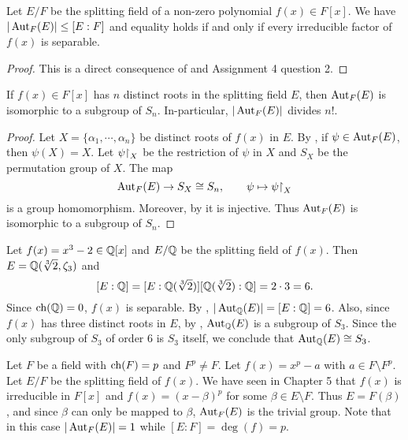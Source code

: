 \documentclass[11pt]{article}
\begin{document}
\begin{theorem}
    Let $E/F$ be the splitting field of a non-zero polynomial $f(x)\in F[x]$. We have $|\operatorname{Aut}_F(E)|\leq[E:F]$ and equality holds if and only if every irreducible factor of $f(x)$ is separable.
\end{theorem}

\begin{proof}
    This is a direct consequence of  and Assignment 4 question 2.
    
\end{proof}

\begin{theorem}
    If $f(x)\in F[x]$ has $n$ distinct roots in the splitting field $E$, then $\operatorname{Aut}_F(E)$ is isomorphic to a subgroup of $S_n$. In-particular, $|\operatorname{Aut}_F(E)|$ divides $n!$.
\end{theorem}

\begin{proof}
    Let $X=\{\alpha_1,\cdots,\alpha_n\}$ be distinct roots of $f(x)$ in $E$. By , if $\psi\in\operatorname{Aut}_F(E)$, then $\psi(X)=X$. Let $\psi{\upharpoonright}_X$ be the restriction of $\psi$ in $X$ and $S_X$ be the permutation group of $X$. The map
    \[\operatorname{Aut}_F(E)\to S_X\cong S_n,\qquad\psi\mapsto\psi{\upharpoonright}_X\]
    is a group homomorphism. Moreover, by  it is injective. Thus $\operatorname{Aut}_F(E)$ is isomorphic to a subgroup of $S_n$.
    
\end{proof}

\begin{example}
    Let $f(x)=x^3-2\in\mathbb{Q}[x]$ and $E/\mathbb{Q}$ be the splitting field of $f(x)$. Then $E=\mathbb{Q}(\sqrt[3]{2},\zeta_3)$ and
    \[[E:\mathbb{Q}]=[E:\mathbb{Q}(\sqrt[3]{2})][\mathbb{Q}(\sqrt[3]{2}):\mathbb{Q}]=2\cdot3=6.\]
    Since $\operatorname{ch}(\mathbb{Q})=0$, $f(x)$ is separable. By , $|\operatorname{Aut}_{\mathbb{Q}}(E)|=[E:\mathbb{Q}]=6$. Also, since $f(x)$ has three distinct roots in $E$, by , $\operatorname{Aut}_{\mathbb{Q}}(E)$ is a subgroup of $S_3$. Since the only subgroup of $S_3$ of order 6 is $S_3$ itself, we conclude that $\operatorname{Aut}_{\mathbb{Q}}(E)\cong S_3$.
\end{example}

\begin{example}
    Let $F$ be a field with $\operatorname{ch}(F)=p$ and $F^p\neq F$. Let $f(x)=x^p-a$ with $a\in F\setminus F^p$. Let $E/F$ be the splitting field of $f(x)$. We have seen in Chapter 5 that $f(x)$ is irreducible in $F[x]$ and $f(x)=(x-\beta)^p$ for some $\beta\in E\setminus F$. Thus $E=F(\beta)$, and since $\beta$ can only be mapped to $\beta$, $\operatorname{Aut}_F(E)$ is the trivial group. Note that in this case $|\operatorname{Aut}_F(E)|=1$ while $[E:F]=\deg(f)=p$.
\end{example}
\end{document}
